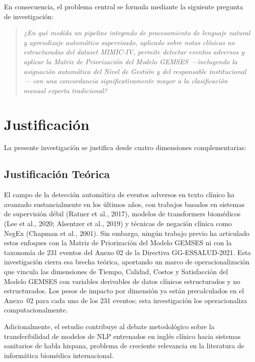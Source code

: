 En consecuencia, el problema central se formula mediante la siguiente pregunta de investigación:

\begin{quote}
\textit{¿En qué medida un pipeline integrado de procesamiento de lenguaje natural y aprendizaje automático supervisado, aplicado sobre notas clínicas no estructuradas del \textit{dataset} MIMIC-IV, permite detectar eventos adversos y aplicar la Matriz de Priorización del Modelo GEMSES ---incluyendo la asignación automática del Nivel de Gestión y del responsable institucional--- con una concordancia significativamente mayor a la clasificación manual experta tradicional?}
\end{quote}

\section{Justificación}
\label{sec:justificacion}

La presente investigación se justifica desde cuatro dimensiones complementarias:

\subsection{Justificación Teórica}
\label{subsec:justif_teorica}

El campo de la detección automática de eventos adversos en texto clínico ha avanzado sustancialmente en los últimos años, con trabajos basados en sistemas de supervisión débil (Ratner et al., 2017), modelos de transformers biomédicos (Lee et al., 2020; Alsentzer et al., 2019) y técnicas de negación clínica como NegEx (Chapman et al., 2001). Sin embargo, ningún trabajo previo ha articulado estos enfoques con la Matriz de Priorización del Modelo GEMSES ni con la taxonomía de 231 eventos del Anexo 02 de la Directiva GG-ESSALUD-2021. Esta investigación cierra esa brecha teórica, aportando un marco de operacionalización que vincula las dimensiones de Tiempo, Calidad, Costos y Satisfacción del Modelo GEMSES con variables derivables de datos clínicos estructurados y no estructurados. Los pesos de impacto por dimensión ya están precalculados en el Anexo~02 para cada uno de los 231 eventos; esta investigación los operacionaliza computacionalmente.

Adicionalmente, el estudio contribuye al debate metodológico sobre la transferibilidad de modelos de NLP entrenados en inglés clínico hacia sistemas sanitarios de habla hispana, problema de creciente relevancia en la literatura de informática biomédica internacional.

